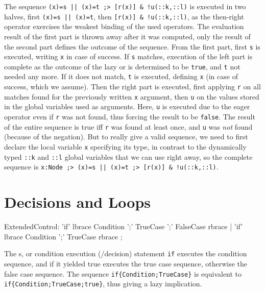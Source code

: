 \begin{example}
The sequence \verb#(x)=s || (x)=t ;> [r(x)] & !u(::k,::l)# is executed in two halves,
first \verb#(x)=s || (x)=t#,
then \verb#[r(x)] & !u(::k,::l)#,
as the then-right operator exercises the weakest binding of the used operators.
The evaluation result of the first part is thrown away after it was computed, only the result of the second part defines the outcome of the sequence.
From the first part, first \texttt{s} is executed, writing \texttt{x} in case of success.
If \texttt{s} matches, execution of the left part is complete as the outcome of the lazy or is determined to be \texttt{true},
and \texttt{t} not needed any more.
If it does not match, \texttt{t} is executed, defining \texttt{x} (in case of success, which we assume).
Then the right part is executed, first applying \texttt{r} on all matches found for the previously written \texttt{x} argument,
then \texttt{u} on the values stored in the global variables used as arguments.
Here, \texttt{u} is executed due to the eager operator even if \texttt{r} was not found, thus forcing the result to be \texttt{false}.
The result of the entire sequence is true iff \texttt{r} was found at least once, and \texttt{u} was \emph{not} found (because of the negation).
But to really give a valid sequence, we need to first declare the local variable \texttt{x} specifying its type, in contrast to the dynamically typed \texttt{::k} and \texttt{::l} global variables that we can use right away,
so the complete sequence is \verb#x:Node ;> (x)=s || (x)=t ;> [r(x)] & !u(::k,::l)#.
\end{example}

\section{Decisions and Loops}

\begin{rail} 
  ExtendedControl: 
	'if' lbrace Condition ';' TrueCase ';' FalseCase rbrace |
	'if' lbrace Condition ';' TrueCase rbrace
	;
\end{rail}

The s, or condition execution (/decision) statement \texttt{if} executes the condition sequence, and if it yielded true executes the true case sequence, otherwise the false case sequence.
The sequence \verb#if{Condition;TrueCase}# is equivalent to \verb#if{Condition;TrueCase;true}#, thus giving a lazy implication.

